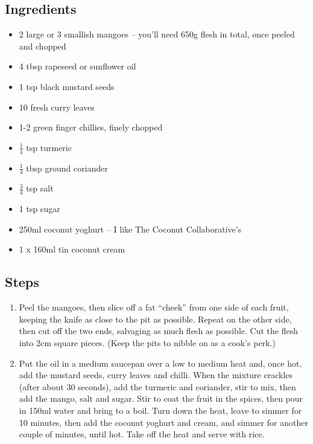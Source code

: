 \documentclass{book}
\begin{document}
\subsection*{Ingredients}
\begin{itemize}
\item 2 large or 3 smallish mangoes – you’ll need 650g flesh in total, once peeled and chopped
\item 4 tbsp rapeseed or sunflower oil
\item 1 tsp black mustard seeds
\item 10 fresh curry leaves
\item 1-2 green finger chillies, finely chopped
\item $\frac{1}{4}$ tsp turmeric
\item $\frac{1}{4}$ tbsp ground coriander
\item $\frac{3}{4}$ tsp salt
\item 1 tsp sugar
\item 250ml coconut yoghurt – I like The Coconut Collaborative’s
\item 1 x 160ml tin coconut cream
\end{itemize}

\subsection*{Steps}
\begin{enumerate}
\item Peel the mangoes, then slice off a fat “cheek” from one side of each fruit, keeping the knife as close to the pit as possible. Repeat on the other side, then cut off the two ends, salvaging as much flesh as possible. Cut the flesh into 2cm square pieces. (Keep the pits to nibble on as a cook’s perk.)
\item Put the oil in a medium saucepan over a low to medium heat and, once hot, add the mustard seeds, curry leaves and chilli. When the mixture crackles (after about 30 seconds), add the turmeric and coriander, stir to mix, then add the mango, salt and sugar. Stir to coat the fruit in the spices, then pour in 150ml water and bring to a boil. Turn down the heat, leave to simmer for 10 minutes, then add the coconut yoghurt and cream, and simmer for another couple of minutes, until hot. Take off the heat and serve with rice.
\end{enumerate}
\newpage
\end{document}
